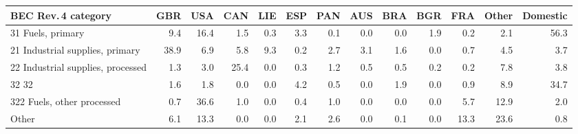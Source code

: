 \begin{tabular}{lrrrrrrrrrrrr}
\toprule
BEC Rev.\,4 category & GBR & USA & CAN & LIE & ESP & PAN & AUS & BRA & BGR & FRA & Other & Domestic \\
\midrule
31 Fuels, primary & 9.4 & 16.4 & 1.5 & 0.3 & 3.3 & 0.1 & 0.0 & 0.0 & 1.9 & 0.2 & 2.1 & 56.3 \\
21 Industrial supplies, primary & 38.9 & 6.9 & 5.8 & 9.3 & 0.2 & 2.7 & 3.1 & 1.6 & 0.0 & 0.7 & 4.5 & 3.7 \\
22 Industrial supplies, processed & 1.3 & 3.0 & 25.4 & 0.0 & 0.3 & 1.2 & 0.5 & 0.5 & 0.2 & 0.2 & 7.8 & 3.8 \\
32 32 & 1.6 & 1.8 & 0.0 & 0.0 & 4.2 & 0.5 & 0.0 & 1.9 & 0.0 & 0.9 & 8.9 & 34.7 \\
322 Fuels, other processed & 0.7 & 36.6 & 1.0 & 0.0 & 0.4 & 1.0 & 0.0 & 0.0 & 0.0 & 5.7 & 12.9 & 2.0 \\
Other & 6.1 & 13.3 & 0.0 & 0.0 & 2.1 & 2.6 & 0.0 & 0.1 & 0.0 & 13.3 & 23.6 & 0.8 \\
\bottomrule
\end{tabular}
